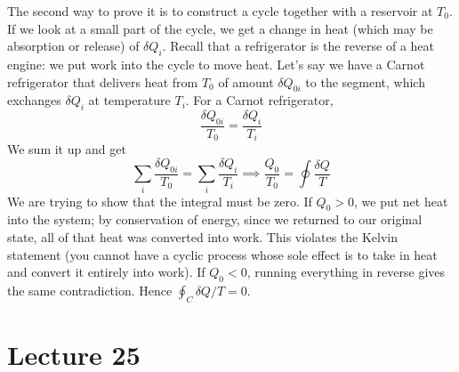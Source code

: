 \documentclass{report}
\numberwithin{equation}{section}
\begin{document}
The second way to prove it is to construct a cycle together with a reservoir at $T_0$. If we look at a small part of the cycle, we get a change in heat (which may be absorption or release) of $\delta Q_i$. Recall that a refrigerator is the reverse of a heat engine: we put work into the cycle to move heat. Let's say we have a Carnot refrigerator that delivers heat from $T_0$ of amount $\delta Q_{0i}$ to the segment, which exchanges $\delta Q_i$ at temperature $T_i$. For a Carnot refrigerator,
\begin{equation*}
    \frac{\delta Q_{0i}}{T_0} = \frac{\delta Q_i}{T_i}
\end{equation*}
We sum it up and get
\begin{equation*}
    \sum_i \frac{\delta Q_{0i}}{T_0} = \sum_i \frac{\delta Q_i}{T_i} \implies \frac{Q_0}{T_0} = \oint \frac{\delta Q}{T}
\end{equation*}
We are trying to show that the integral must be zero. If $Q_0>0$, we put net heat into the system; by conservation of energy, since we returned to our original state, all of that heat was converted into work. This violates the Kelvin statement (you cannot have a cyclic process whose sole effect is to take in heat and convert it entirely into work). If $Q_0<0$, running everything in reverse gives the same contradiction. Hence $\oint_C\delta Q/T = 0$.
\section{Lecture 25}
\end{document}
